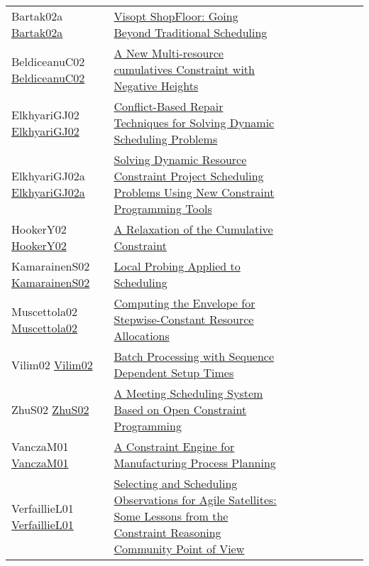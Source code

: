 {\begin{longtable}{p{3cm}p{7cm}lllllll}
Bartak02a \href{https://doi.org/10.1007/3-540-36607-5\_14}{Bartak02a} &  \href{papers/Bartak02a.pdf}{Visopt ShopFloor: Going Beyond Traditional Scheduling} &  &  &  &  &  &  & \\
BeldiceanuC02 \href{https://doi.org/10.1007/3-540-46135-3\_5}{BeldiceanuC02} &  \href{papers/BeldiceanuC02.pdf}{A New Multi-resource cumulatives Constraint with Negative Heights} &  &  &  &  &  &  & \\
ElkhyariGJ02 \href{https://doi.org/10.1007/3-540-46135-3\_49}{ElkhyariGJ02} &  \href{papers/ElkhyariGJ02.pdf}{Conflict-Based Repair Techniques for Solving Dynamic Scheduling Problems} &  &  &  &  &  &  & \\
ElkhyariGJ02a \href{https://doi.org/10.1007/978-3-540-45157-0\_3}{ElkhyariGJ02a} &  \href{papers/ElkhyariGJ02a.pdf}{Solving Dynamic Resource Constraint Project Scheduling Problems Using New Constraint Programming Tools} &  &  &  &  &  &  & \\
HookerY02 \href{https://doi.org/10.1007/3-540-46135-3\_46}{HookerY02} &  \href{papers/HookerY02.pdf}{A Relaxation of the Cumulative Constraint} &  &  &  &  &  &  & \\
KamarainenS02 \href{https://doi.org/10.1007/3-540-46135-3\_11}{KamarainenS02} &  \href{papers/KamarainenS02.pdf}{Local Probing Applied to Scheduling} &  &  &  &  &  &  & \\
Muscettola02 \href{https://doi.org/10.1007/3-540-46135-3\_10}{Muscettola02} &  \href{papers/Muscettola02.pdf}{Computing the Envelope for Stepwise-Constant Resource Allocations} &  &  &  &  &  &  & \\
Vilim02 \href{https://doi.org/10.1007/3-540-46135-3\_62}{Vilim02} &  \href{papers/Vilim02.pdf}{Batch Processing with Sequence Dependent Setup Times} &  &  &  &  &  &  & \\
ZhuS02 \href{https://doi.org/10.1007/3-540-47961-9\_69}{ZhuS02} &  \href{papers/ZhuS02.pdf}{A Meeting Scheduling System Based on Open Constraint Programming} &  &  &  &  &  &  & \\
VanczaM01 \href{https://doi.org/10.1007/3-540-45578-7\_60}{VanczaM01} &  \href{papers/VanczaM01.pdf}{A Constraint Engine for Manufacturing Process Planning} &  &  &  &  &  &  & \\
VerfaillieL01 \href{https://doi.org/10.1007/3-540-45578-7\_55}{VerfaillieL01} &  \href{papers/VerfaillieL01.pdf}{Selecting and Scheduling Observations for Agile Satellites: Some Lessons from the Constraint Reasoning Community Point of View} &  &  &  &  &  &  & \\

\end{longtable}}
